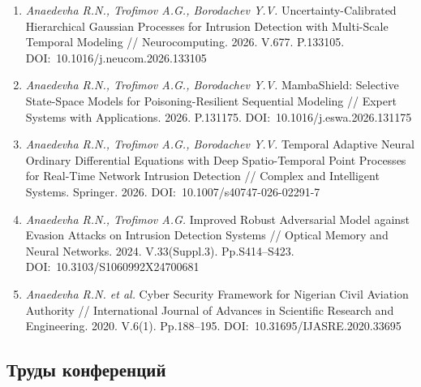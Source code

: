 \documentclass[12pt,a5paper]{article}
\begin{document}
\begin{enumerate}
\item \textit{Anaedevha R.N., Trofimov A.G., Borodachev Y.V.} Uncertainty-Calibrated Hierarchical Gaussian Processes for Intrusion Detection with Multi-Scale Temporal Modeling // Neurocomputing. 2026. V.677. P.133105. DOI:~10.1016/j.neucom.2026.133105

\item \textit{Anaedevha R.N., Trofimov A.G., Borodachev Y.V.} MambaShield: Selective State-Space Models for Poisoning-Resilient Sequential Modeling // Expert Systems with Applications. 2026. P.131175. DOI:~10.1016/j.eswa.2026.131175

\item \textit{Anaedevha R.N., Trofimov A.G., Borodachev Y.V.} Temporal Adaptive Neural Ordinary Differential Equations with Deep Spatio-Temporal Point Processes for Real-Time Network Intrusion Detection // Complex and Intelligent Systems. Springer. 2026. DOI:~10.1007/s40747-026-02291-7

\item \textit{Anaedevha R.N., Trofimov A.G.} Improved Robust Adversarial Model against Evasion Attacks on Intrusion Detection Systems // Optical Memory and Neural Networks. 2024. V.33(Suppl.3). Pp.S414--S423. DOI:~10.3103/S1060992X24700681

\item \textit{Anaedevha R.N. et al.} Cyber Security Framework for Nigerian Civil Aviation Authority // International Journal of Advances in Scientific Research and Engineering. 2020. V.6(1). Pp.188--195. DOI:~10.31695/IJASRE.2020.33695
\end{enumerate}

\subsection*{Труды конференций}
\end{document}
